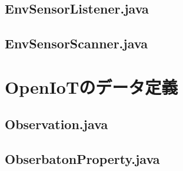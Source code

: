 \documentclass{kuisthesis}			%
\begin{document}
\subsection{EnvSensorListener.java}


\subsection{EnvSensorScanner.java}


\section{OpenIoTのデータ定義}
\subsection{Observation.java}


\subsection{ObserbatonProperty.java}

\end{document}
